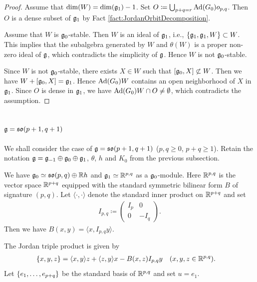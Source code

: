 \begin{proof}
	Assume that $\dim(W) = \dim(\mathfrak{g}_1) - 1$.
	Set $O\coloneq \bigcup_{p+q=r} \mathrm{Ad}(G_0)o_{p,q}$.
	Then $O$ is a dense subset of $\mathfrak{g}_1$ by Fact \ref{fact:JordanOrbitDecomposition}.

	Assume that $W$ is $\mathfrak{g}_0$-stable.
	Then $W$ is an ideal of $\mathfrak{g}_1$, i.e., $\{\mathfrak{g}_1, \mathfrak{g}_1, W\} \subset W$.
	This implies that the subalgebra generated by $W$ and $\theta(W)$ is a proper non-zero ideal of $\mathfrak{g}$, which contradicts the simplicity of $\mathfrak{g}$.
	Hence $W$ is not $\mathfrak{g}_0$-stable.
	
	Since $W$ is not $\mathfrak{g}_0$-stable, there exists $X \in W$ such that $[\mathfrak{g}_0, X] \not\subset W$.
	Then we have $W + [\mathfrak{g}_0, X] = \mathfrak{g}_1$.
	Hence $\mathrm{Ad}(G_0)W$ contains an open neighborhood of $X$ in $\mathfrak{g}_1$.
	Since $O$ is dense in $\mathfrak{g}_1$, we have $\mathrm{Ad}(G_0)W \cap O \neq \emptyset$, which contradicts the assumption.
\end{proof}


\subsection{\texorpdfstring{$\mathfrak{g} = \mathfrak{so}(p+1, q+1)$}{g=so(p+1,q+1)}} \label{subsect:JordanAlgebraSO(p,q)}

We shall consider the case of $\mathfrak{g} = \mathfrak{so}(p+1, q+1)$ ($p, q \geq 0$, $p+q \geq 1$).
Retain the notation $\mathfrak{g} = \mathfrak{g}_{-1} \oplus \mathfrak{g}_0 \oplus \mathfrak{g}_1$, $\theta$, $h$ and $K_0$ from the previous subsection.

We have $\mathfrak{g}_0 \simeq \mathfrak{so}(p, q) \oplus \mathbb{R} h$ and $\mathfrak{g}_1 \simeq \mathbb{R}^{p, q}$ as a $\mathfrak{g}_0$-module.
Here $\mathbb{R}^{p, q}$ is the vector space $\mathbb{R}^{p+q}$ equipped with the standard symmetric bilinear form $B$ of signature $(p, q)$.
Let $\langle \cdot, \cdot \rangle$ denote the standard inner product on $\mathbb{R}^{p+q}$ and set
\begin{align*}
	I_{p,q} \coloneq \begin{pmatrix}
		I_p & 0 \\
		0 & -I_q
	\end{pmatrix}.
\end{align*}
Then we have $B(x,y) = \langle x, I_{p,q} y \rangle$.

The Jordan triple product is given by
\begin{align*}
	\{x, y, z\} &= \langle x, y \rangle z + \langle z, y \rangle x - B(x, z)I_{p,q}y \quad (x, y, z \in \mathbb{R}^{p,q}).
\end{align*}
Let $\left\{e_1, \ldots, e_{p+q} \right\}$ be the standard basis of $\mathbb{R}^{p,q}$ and set $u = e_1$.

